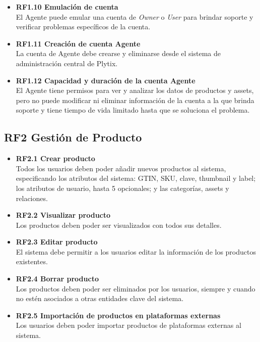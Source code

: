 \begin{itemize}
    \item \textbf{RF1.10 Emulación de cuenta} \\
    El Agente puede emular una cuenta de  \textit{Owner} o  \textit{User} para brindar soporte y verificar problemas específicos de la cuenta.

    \item \textbf{RF1.11 Creación de cuenta Agente} \\
    La cuenta de Agente debe crearse y eliminarse desde el sistema de administración central de Plytix.


    \item \textbf{RF1.12 Capacidad y duración de la cuenta Agente} \\
    El Agente tiene permisos para ver y analizar los datos de productos y assets, pero no puede modificar ni eliminar información de la cuenta a la que brinda soporte y tiene tiempo de vida limitado hasta que se soluciona el problema.
\end{itemize}

\subsection*{RF2 Gestión de Producto}

\begin{itemize}
    \item \textbf{RF2.1 Crear producto} \\
    Todos los usuarios deben poder añadir nuevos productos al sistema, especificando los atributos del sistema: GTIN, SKU, clave, thumbnail y label; los atributos de usuario, hasta 5 opcionales; y las categorías, assets y relaciones.

    \item \textbf{RF2.2 Visualizar producto} \\
    Los productos deben poder ser visualizados con todos sus detalles.

    \item \textbf{RF2.3 Editar producto} \\
    El sistema debe permitir a los usuarios editar la información de los productos existentes.

    \item \textbf{RF2.4 Borrar producto} \\
    Los productos deben poder ser eliminados por los usuarios, siempre y cuando no estén asociados a otras entidades clave del sistema.

    \item \textbf{RF2.5 Importación de productos en plataformas externas} \\
    Los usuarios deben poder importar productos de plataformas externas al sistema.
\end{itemize}

